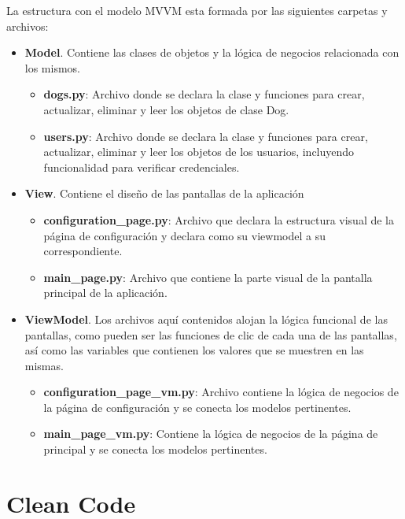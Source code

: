 \documentclass[11pt]{article}
\begin{document}
		\par La estructura con el modelo MVVM esta formada por las siguientes carpetas y archivos:
		\begin{itemize}
			\item \textbf{Model}. Contiene las clases de objetos y la lógica de negocios relacionada con los mismos.
				\begin{itemize}
					\item \textbf{dogs.py}: Archivo donde se declara la clase y funciones para crear, actualizar, eliminar y leer los objetos de clase Dog.
					\item \textbf{users.py}: Archivo donde se declara la clase y funciones para crear, actualizar, eliminar y leer los objetos de los usuarios, incluyendo funcionalidad para verificar credenciales.
				\end{itemize}
			\item \textbf{View}. Contiene el diseño de las pantallas de la aplicación
				\begin{itemize}
					\item \textbf{configuration\_page.py}: Archivo que declara la estructura visual de la página de configuración y declara como su viewmodel a su correspondiente.
					\item \textbf{main\_page.py}: Archivo que contiene la parte visual de la pantalla principal de la aplicación.
				\end{itemize}
			\item \textbf{ViewModel}. Los archivos aquí contenidos alojan la lógica funcional de las pantallas, como pueden ser las funciones de clic de cada una de las pantallas, así como las variables que contienen los valores que se muestren en las mismas.
				\begin{itemize}
				\item \textbf{configuration\_page\_vm.py}: Archivo contiene la lógica de negocios de la página de configuración y se conecta los modelos pertinentes.
				\item \textbf{main\_page\_vm.py}: Contiene la lógica de negocios de la página de principal y se conecta los modelos pertinentes.
				\end{itemize}
		\end{itemize}
	\newpage \section{Clean Code}
	
\end{document}
